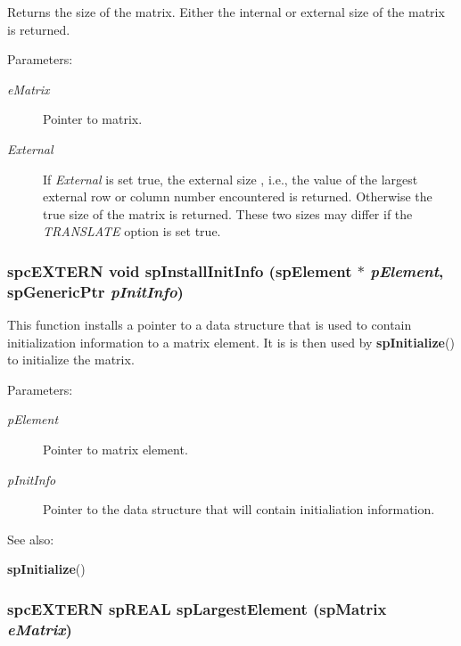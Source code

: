 Returns the size of the matrix. Either the internal or external size of the matrix is returned.\begin{Desc}
\item[Parameters: ]\par
\begin{description}
\item[{\em 
e\-Matrix}]Pointer to matrix. \item[{\em 
External}]If {\em External} is set true, the external size , i.e., the value of the largest external row or column number encountered is returned. Otherwise the true size of the matrix is returned. These two sizes may differ if the {\em TRANSLATE} option is set true. \end{description}
\end{Desc}
\subsubsection{\setlength{\rightskip}{0pt plus 5cm}spc\-EXTERN void sp\-Install\-Init\-Info ({\bf sp\-Element} $\ast$ {\em p\-Element}, sp\-Generic\-Ptr {\em p\-Init\-Info})}\label{spMatrix_8h_a42}


This function installs a pointer to a data structure that is used to contain initialization information to a matrix element. It is is then used by {\bf sp\-Initialize}() to initialize the matrix.\begin{Desc}
\item[Parameters: ]\par
\begin{description}
\item[{\em 
p\-Element}]Pointer to matrix element. \item[{\em 
p\-Init\-Info}]Pointer to the data structure that will contain initialiation information. \end{description}
\end{Desc}
\begin{Desc}
\item[See also: ]\par
{\bf sp\-Initialize}() \end{Desc}
\subsubsection{\setlength{\rightskip}{0pt plus 5cm}spc\-EXTERN sp\-REAL sp\-Largest\-Element ({\bf sp\-Matrix} {\em e\-Matrix})}\label{spMatrix_8h_a43}


